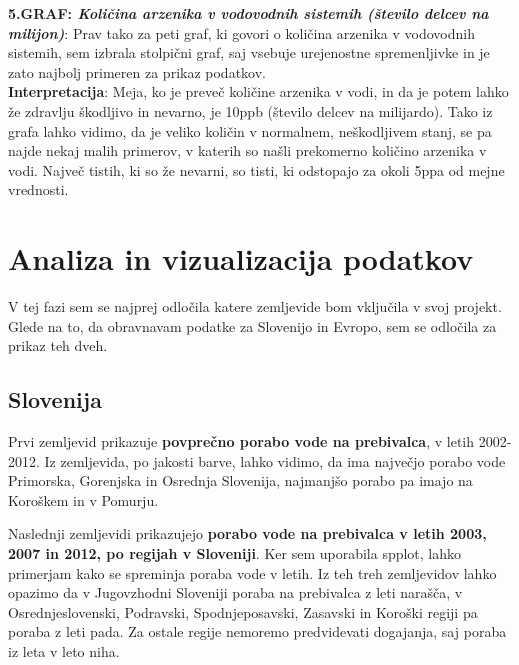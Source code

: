 \documentclass[11pt,a4paper]{article}
\begin{document}

\newpage
\textbf{5.GRAF: \emph{Količina arzenika v vodovodnih sistemih (število delcev na milijon)}}: Prav tako za peti graf, ki govori o količina arzenika v vodovodnih sistemih, sem izbrala stolpični graf, saj vsebuje urejenostne spremenljivke in je zato najbolj primeren za prikaz podatkov.\\
\textbf{Interpretacija}: Meja, ko je preveč količine arzenika v vodi, in da je potem lahko že zdravlju škodljivo in nevarno, je 10ppb (število delcev na milijardo). Tako iz grafa lahko vidimo, da je veliko količin v normalnem, neškodljivem stanj, se pa najde nekaj malih primerov, v katerih so našli prekomerno količino arzenika v vodi. Največ tistih, ki so že nevarni, so tisti, ki odstopajo za okoli 5ppa od mejne vrednosti.\\



\section{Analiza in vizualizacija podatkov}

V tej fazi sem se najprej odločila katere zemljevide bom vključila v svoj projekt. Glede na to, da obravnavam podatke za Slovenijo in Evropo, sem se odločila za prikaz teh dveh.
\vspace{5mm} 

\subsection{Slovenija}
Prvi zemljevid prikazuje \textbf{povprečno porabo vode na prebivalca}, v letih 2002-2012. Iz zemljevida, po jakosti barve, lahko vidimo, da ima največjo porabo vode Primorska, Gorenjska in Osrednja Slovenija, najmanjšo porabo pa imajo na Koroškem in v Pomurju.


\newpage
Naslednji zemljevidi prikazujejo \textbf{porabo vode na prebivalca v letih 2003, 2007 in 2012, po regijah v Sloveniji}. Ker sem uporabila spplot, lahko primerjam kako se spreminja poraba vode v letih. Iz teh treh zemljevidov lahko opazimo da v Jugovzhodni Sloveniji poraba na prebivalca z leti narašča, v Osrednjeslovenski, Podravski, Spodnjeposavski, Zasavski in Koroški regiji pa poraba z leti pada. Za ostale regije nemoremo predvidevati dogajanja, saj poraba iz leta v leto niha. 
\end{document}
